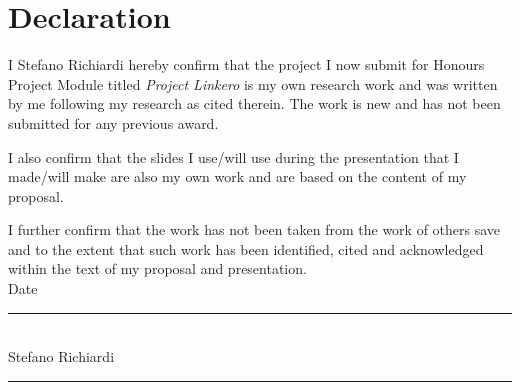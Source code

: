 \chapter{Declaration}
I Stefano Richiardi hereby confirm that the project I now submit for Honours
Project Module titled \emph{Project Linkero} is my own research work and was
written by me following my research as cited therein. The work is new and has
not been submitted for any previous award.

I also confirm that the slides I use/will use during the presentation that I made/will
make are also my own work and are based on the content of my proposal.

I further confirm that the work has not been taken from the work of others save and
to the extent that such work has been identified, cited and acknowledged within the
text of my proposal and presentation.\\[.5in]

\noindent Date\\[.25in]
\rule[0.5em]{25em}{0.5pt}\\[.25in] %
\noindent Stefano Richiardi\\[.25in]
\rule[0.5em]{25em}{0.5pt} %